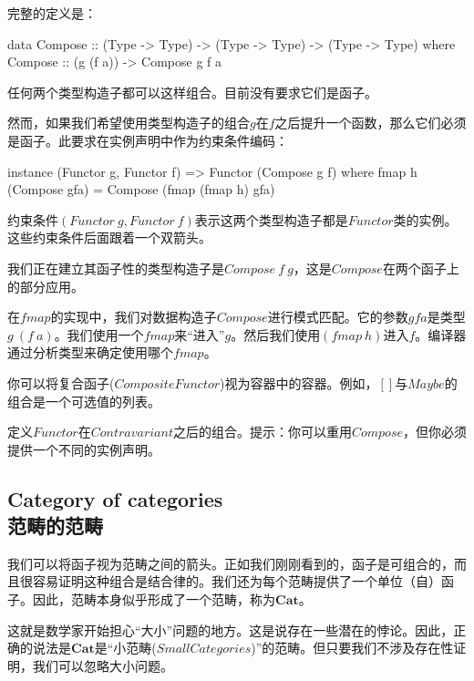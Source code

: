 \documentclass[DaoFP]{subfiles}
\begin{document}
    完整的定义是：

    \begin{haskell}
        data Compose :: (Type -> Type) -> (Type -> Type) -> (Type -> Type)
        where
        Compose :: (g (f a)) -> Compose g f a
    \end{haskell}

    任何两个类型构造子都可以这样组合。目前没有要求它们是函子。

    然而，如果我们希望使用类型构造子的组合$g$在$f$之后提升一个函数，那么它们必须是函子。此要求在实例声明中作为约束条件编码：

    \begin{haskell}
        instance (Functor g, Functor f) => Functor (Compose g f) where
        fmap h (Compose gfa) = Compose (fmap (fmap h) gfa)
    \end{haskell}

    约束条件$(Functor\ g, Functor\ f)$表示这两个类型构造子都是$Functor$类的实例。这些约束条件后面跟着一个双箭头。

    我们正在建立其函子性的类型构造子是$Compose\ f\ g$，这是$Compose$在两个函子上的部分应用。

    在$fmap$的实现中，我们对数据构造子$Compose$进行模式匹配。它的参数$gfa$是类型$g\ (f\ a)$。我们使用一个$fmap$来“进入”$g$。然后我们使用$(fmap\ h)$进入$f$。编译器通过分析类型来确定使用哪个$fmap$。

    你可以将复合函子($Composite Functor$)视为容器中的容器。例如，$[]$与$Maybe$的组合是一个可选值的列表。

    \begin{exercise}
        定义$Functor$在$Contravariant$之后的组合。提示：你可以重用$Compose$，但你必须提供一个不同的实例声明。
    \end{exercise}

    \subsection{Category of categories\\范畴的范畴}

    我们可以将函子视为范畴之间的箭头。正如我们刚刚看到的，函子是可组合的，而且很容易证明这种组合是结合律的。我们还为每个范畴提供了一个单位（自）函子。因此，范畴本身似乎形成了一个范畴，称为$\mathbf{Cat}$。

    这就是数学家开始担心“大小”问题的地方。这是说存在一些潜在的悖论。因此，正确的说法是$\mathbf{Cat}$是“小范畴($Small Categories$)”的范畴。但只要我们不涉及存在性证明，我们可以忽略大小问题。
\end{document}
